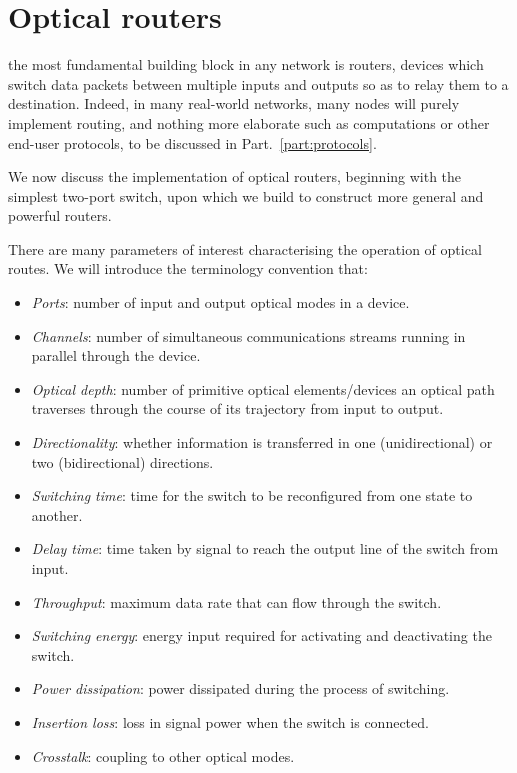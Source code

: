 %
%

\section{Optical routers} 

 the most fundamental building block in any network is routers, devices which switch data packets between multiple inputs and outputs so as to relay them to a destination. Indeed, in many real-world networks, many nodes will purely implement routing, and nothing more elaborate such as computations or other end-user protocols, to be discussed in Part.~\ref{part:protocols}.

We now discuss the implementation of optical routers, beginning with the simplest two-port switch, upon which we build to construct more general and powerful routers.

There are many parameters of interest characterising the operation of optical routes. We will introduce the terminology convention that:
\begin{itemize}
	\item \textit{Ports}: number of input and output optical modes in a device.
	\item \textit{Channels}: number of simultaneous communications streams running in parallel through the device.
	\item \textit{Optical depth}: number of primitive optical elements/devices an optical path traverses through the course of its trajectory from input to output.
	\item \textit{Directionality}: whether information is transferred in one (unidirectional) or two (bidirectional) directions.
	\item \textit{Switching time}: time for the switch to be reconfigured from one state to another.
	\item \textit{Delay time}: time taken by signal to reach the output line of the switch from input.
	\item \textit{Throughput}: maximum data rate that can flow through the switch.
	\item \textit{Switching energy}: energy input required for activating and deactivating the switch.
	\item \textit{Power dissipation}: power dissipated during the process of switching.
	\item \textit{Insertion loss}: loss in signal power when the switch is connected.
	\item \textit{Crosstalk}: coupling to other optical modes.
\end{itemize}

